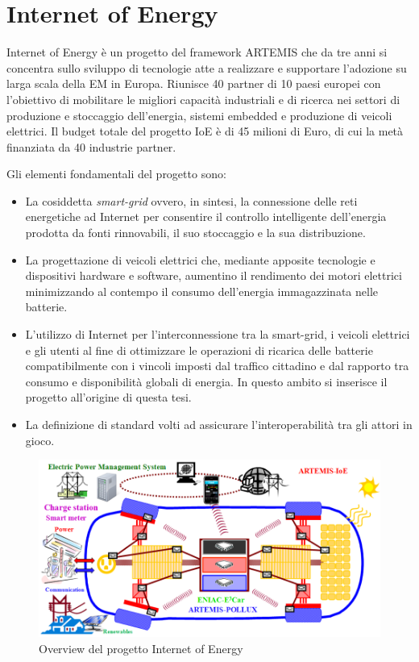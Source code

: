 \section{Internet of Energy}

Internet of Energy è un progetto del framework ARTEMIS che da tre anni si concentra sullo sviluppo di tecnologie atte a realizzare e supportare l'adozione su larga scala della EM in Europa. Riunisce 40 partner di 10 paesi europei con l'obiettivo di mobilitare le migliori capacità industriali e di ricerca nei settori di produzione e stoccaggio dell'energia, sistemi embedded e produzione di veicoli elettrici. Il budget totale del progetto IoE è di 45 milioni di Euro, di cui la metà finanziata da 40 industrie partner.

Gli elementi fondamentali del progetto sono:

\begin{itemize}
	\item La cosiddetta \emph{smart-grid} ovvero, in sintesi, la connessione delle reti energetiche ad Internet per consentire il controllo intelligente dell'energia prodotta da fonti rinnovabili, il suo stoccaggio e la sua distribuzione.
	\item La progettazione di veicoli elettrici che, mediante apposite tecnologie e dispositivi hardware e software, aumentino il rendimento dei motori elettrici minimizzando al contempo il consumo dell'energia immagazzinata nelle batterie.
	\item L'utilizzo di Internet per l'interconnessione tra la smart-grid, i veicoli elettrici e gli utenti al fine di ottimizzare le operazioni di ricarica delle batterie compatibilmente con i vincoli imposti dal traffico cittadino e dal rapporto tra consumo e disponibilità globali di energia. In questo ambito si inserisce il progetto all'origine di questa tesi.
	\item La definizione di standard volti ad assicurare l'interoperabilità tra gli attori in gioco.
\end{itemize}

\begin{figure}[H]
	\centering
	\includegraphics[width=1.0\textwidth]{assets/ioe.png}
	\caption{Overview del progetto Internet of Energy}
	\label{fig:ioe}
\end{figure}

